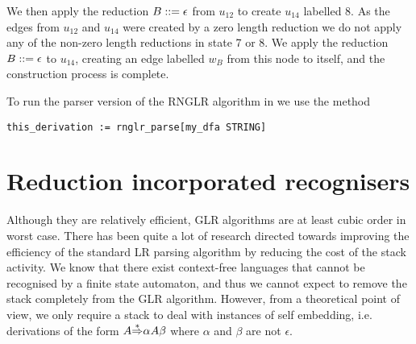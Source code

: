 We then apply the reduction $B::= \epsilon$ from $u_{12}$ to create
$u_{14}$ labelled 8. As the edges from $u_{12}$ and $u_{14}$ were
created by a zero length reduction we do not
apply any of the non-zero length reductions in state 7 or 8. We apply
the reduction $B::=\epsilon$ to $u_{14}$, creating an edge labelled
$w_B$ from this node to itself, and the construction process is complete.
\begin{center}
\footnotesize

\end{center}



To run the parser version of the RNGLR algorithm in \gtb we use the
method
\begin{center}\label{p_rnparse}
\verb+this_derivation := rnglr_parse[my_dfa STRING]+
\end{center}








\chapter{Reduction incorporated recognisers}\label{RIGLR}

Although they are relatively efficient, GLR algorithms are at least
cubic order in worst case. There has been quite a lot of research
directed towards improving the efficiency of the standard LR parsing
algorithm by reducing the cost of the stack activity.
We know that there exist context-free languages that cannot be
recognised by a finite state automaton, and thus we cannot expect to
remove the stack completely from the GLR algorithm. However, from
a theoretical point of view, we only require a stack to deal with
instances of self embedding, i.e. derivations of the form
$A{\mathop{\Rightarrow}\limits^*}\alpha A\beta$ where $\alpha$ and $\beta$ are not $\epsilon$.

